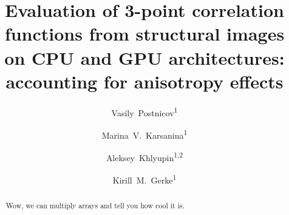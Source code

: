 \documentclass[reprint,amsmath,amssymb,aps,pre,showkeys,showpacs]{revtex4-1}
\begin{document}

\author{Vasily~Postnicov\textsuperscript{1}}
\author{Marina~V.~Karsanina\textsuperscript{1}}
\author{Aleksey~Khlyupin\textsuperscript{1,2}}
\author{Kirill~M.~Gerke\textsuperscript{1}}


\title{Evaluation of 3-point correlation functions from structural images on CPU
  and GPU architectures: accounting for anisotropy effects}

\begin{abstract}
  Wow, we can multiply arrays and tell you how cool it is.
\end{abstract}


\maketitle
\end{document}
